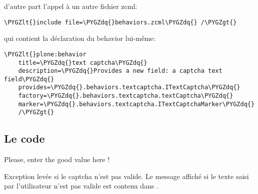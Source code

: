 \documentclass[letterpaper,10pt,french]{sphinxmanual}
\def\PYGZlt{\char`\<}
\def\PYGZgt{\char`\>}
\def\PYGZdq{\char`\"}
\begin{document}
d'autre part l'appel à un autre fichier zcml:

\begin{Verbatim}[commandchars=\\\{\}]
\PYGZlt{}include file=\PYGZdq{}behaviors.zcml\PYGZdq{} /\PYGZgt{}
\end{Verbatim}

qui contient la déclaration du behavior lui-même:

\begin{Verbatim}[commandchars=\\\{\}]
\PYGZlt{}plone:behavior
    title=\PYGZdq{}text captcha\PYGZdq{}
    description=\PYGZdq{}Provides a new field: a captcha text field\PYGZdq{}
    provides=\PYGZdq{}.behaviors.textcaptcha.ITextCaptcha\PYGZdq{}
    factory=\PYGZdq{}.behaviors.textcaptcha.textCaptcha\PYGZdq{}
    marker=\PYGZdq{}.behaviors.textcaptcha.ITextCaptchaMarker\PYGZdq{}
    /\PYGZgt{}
\end{Verbatim}


\subsection{Le code}
\label{behavior:le-code}\label{behavior:module-collective.behavior.textcaptcha.behaviors.textcaptcha}

\begin{fulllineitems}
\label{behavior:collective.behavior.textcaptcha.behaviors.textcaptcha.CaptchaNotValid}
Please, enter the good value here !

\begin{fulllineitems}
\label{behavior:collective.behavior.textcaptcha.behaviors.textcaptcha.CaptchaNotValid.justForDocumentation}
Exception levée si le captcha n'est pas valide. Le message affiché
si le texte saisi par l'utilisateur n'est pas valide est contenu dans
.

\end{fulllineitems}


\end{fulllineitems}

\end{document}
